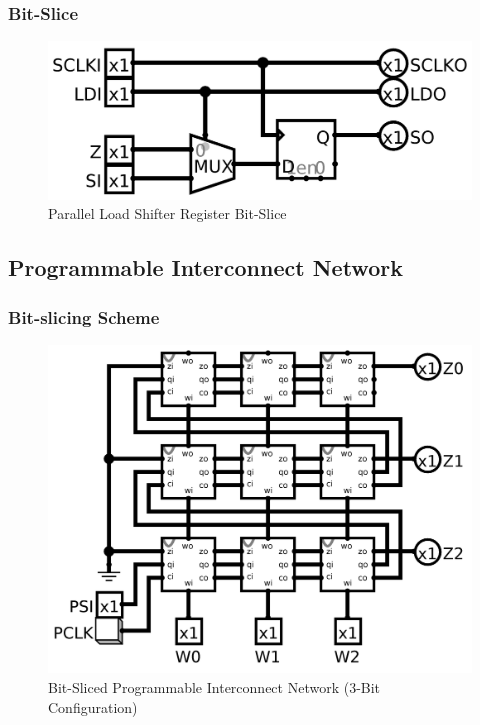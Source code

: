 \documentclass{article}
\begin{document}
        \subsubsection{Bit-Slice}
        \begin{figure}[H]
            \centering
            \includegraphics[width=\linewidth]{../../logisim/shift_slice_mux.png}
            \caption{Parallel Load Shifter Register Bit-Slice}
        \end{figure}

    \subsection{Programmable Interconnect Network}

        \subsubsection{Bit-slicing Scheme}
        \begin{figure}[H]
            \centering
            \includegraphics[width=\linewidth]{../../logisim/pin.png}
            \caption{Bit-Sliced Programmable Interconnect Network (3-Bit Configuration)}
        \end{figure}
\end{document}
